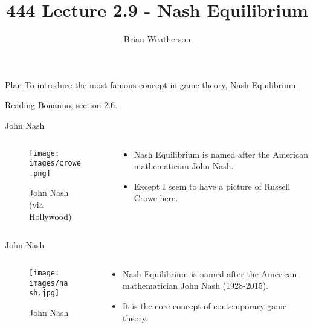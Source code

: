 \documentclass[
  ignorenonframetext,
]{beamer}
\title{444 Lecture 2.9 - Nash Equilibrium}
\author{Brian Weatherson}
\date{}
\providecommand{\tightlist}{%
  \setlength{\itemsep}{0pt}\setlength{\parskip}{0pt}}
\begin{document}
\frame{\titlepage}

\begin{frame}{Plan}
\protect\hypertarget{plan}{}
To introduce the most famous concept in game theory, Nash Equilibrium.
\end{frame}

\begin{frame}{Reading}
\protect\hypertarget{reading}{}
Bonanno, section 2.6.
\end{frame}

\begin{frame}{John Nash}
\protect\hypertarget{john-nash}{}
\begin{columns}[c]
\begin{column}{0.48\textwidth}
\begin{figure}
\centering
\texttt{[image: images/crowe.png]}
\caption{John Nash (via Hollywood)}
\end{figure}
\end{column}

\begin{column}{0.48\textwidth}
\begin{itemize}
\tightlist
\item
  Nash Equilibrium is named after the American mathematician John Nash.
\item
  Except I seem to have a picture of Russell Crowe here.
\end{itemize}
\end{column}
\end{columns}
\end{frame}

\begin{frame}{John Nash}
\protect\hypertarget{john-nash-1}{}
\begin{columns}[c]
\begin{column}{0.48\textwidth}
\begin{figure}
\centering
\texttt{[image: images/nash.jpg]}
\caption{John Nash}
\end{figure}
\end{column}

\begin{column}{0.48\textwidth}
\begin{itemize}
\tightlist
\item
  Nash Equilibrium is named after the American mathematician John Nash
  (1928-2015).
\item
  It is the core concept of contemporary game theory.
\end{itemize}
\end{column}
\end{columns}
\end{frame}
\end{document}

